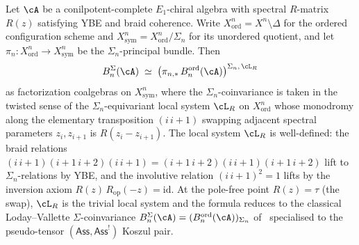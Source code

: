 \begin{proposition}
\label{prop:R-twisted-sigma-n-descent}
Let $\cA$ be a conilpotent-complete $E_1$-chiral algebra with
spectral $R$-matrix $R(z)$ satisfying YBE and braid coherence.
Write $X^n_{\mathrm{ord}} = X^n \setminus \Delta$ for the ordered
configuration scheme and $X^n_{\mathrm{sym}} =
X^n_{\mathrm{ord}}/\Sigma_n$ for its unordered quotient, and let
$\pi_n \colon X^n_{\mathrm{ord}} \to X^n_{\mathrm{sym}}$ be the
$\Sigma_n$-principal bundle. Then
\[
 B^{\Sigma}_n(\cA)
 \;\simeq\;
 \bigl(\pi_{n,*}\,B^{\mathrm{ord}}_n(\cA)\bigr)^{\Sigma_n,\,\cL_R}
\]
as factorization coalgebras on $X^n_{\mathrm{sym}}$, where the
$\Sigma_n$-coinvariance is taken in the twisted sense of the
$\Sigma_n$-equivariant local system $\cL_R$ on
$X^n_{\mathrm{ord}}$ whose monodromy along the elementary
transposition $(i\,i{+}1)$ swapping adjacent spectral parameters
$z_i, z_{i+1}$ is $R(z_i - z_{i+1})$. The local system $\cL_R$ is
well-defined: the braid relations
$(i\,i{+}1)(i{+}1\,i{+}2)(i\,i{+}1)
 = (i{+}1\,i{+}2)(i\,i{+}1)(i{+}1\,i{+}2)$
lift to $\Sigma_n$-relations by YBE, and the involutive relation
$(i\,i{+}1)^2 = 1$ lifts by the inversion axiom
$R(z)\,R_{\mathrm{op}}(-z) = \mathrm{id}$. At the pole-free point
$R(z) = \tau$ (the swap), $\cL_R$ is the trivial local system and
the formula reduces to the classical Loday--Vallette
$\Sigma$-coinvariance
$B^{\Sigma}_n(\cA) = (B^{\mathrm{ord}}_n(\cA))_{\Sigma_n}$
of~\cite{LV12} specialised to the pseudo-tensor
$(\mathsf{Ass}, \mathsf{Ass}^!)$ Koszul pair.
\end{proposition}
